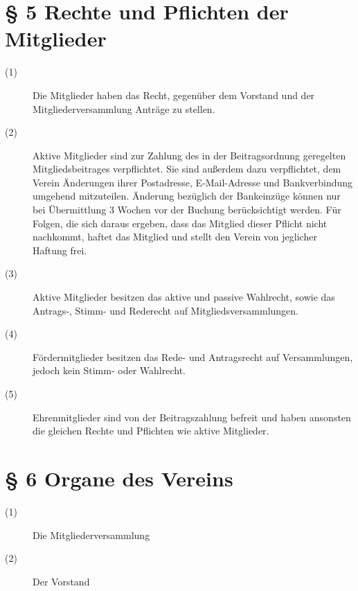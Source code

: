 \documentclass[a4paper,12pt]{scrartcl}
\begin{document}
\begin{description}
\end{description}



\section*{\S{} 5 Rechte und Pflichten der Mitglieder}
\begin{description} 

\item[(1)] Die Mitglieder haben das Recht, gegenüber dem Vorstand und der Mitgliederversammlung Anträge zu stellen.
\item[(2)] Aktive Mitglieder sind zur Zahlung des in der Beitragsordnung geregelten Mitgliedsbeitrages verpflichtet. Sie sind außerdem dazu verpflichtet, dem Verein Änderungen ihrer Postadresse, E-Mail-Adresse und Bankverbindung umgehend mitzuteilen. Änderung bezüglich der Bankeinzüge können nur bei Übermittlung 3 Wochen vor der Buchung berücksichtigt werden. Für Folgen, die sich daraus ergeben, dass das Mitglied dieser Pflicht nicht nachkommt, haftet das Mitglied und stellt den Verein von jeglicher Haftung frei.
\item[(3)] Aktive Mitglieder besitzen das aktive und passive Wahlrecht, sowie das Antrags-, Stimm- und Rederecht auf Mitgliedsversammlungen.
\item[(4)] Fördermitglieder besitzen das Rede- und Antragsrecht auf Versammlungen, jedoch kein Stimm- oder Wahlrecht.
\item[(5)] Ehrenmitglieder sind von der Beitragszahlung befreit und haben ansonsten die gleichen Rechte und Pflichten wie aktive Mitglieder.

\end{description}



\section*{\S{} 6 Organe des Vereins}
\begin{description} 

\item[(1)] Die Mitgliederversammlung
\item[(2)] Der Vorstand

\end{description}
\end{document}
